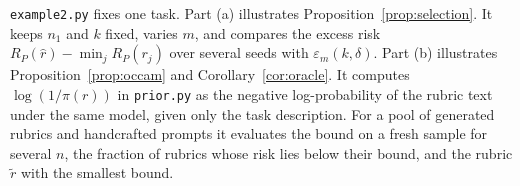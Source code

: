 \documentclass[11pt]{article}
\theoremstyle{plain}
\theoremstyle{definition}
\begin{document}
\texttt{example2.py} fixes one task.
Part (a) illustrates Proposition~\ref{prop:selection}.
It keeps $n_1$ and $k$ fixed, varies $m$, and compares the excess risk $R_P(\hat r)-\min_jR_P(r_j)$ over several seeds with $\varepsilon_m(k,\delta)$.
Part (b) illustrates Proposition~\ref{prop:occam} and Corollary~\ref{cor:oracle}.
It computes $\log(1/\pi(r))$ in \texttt{prior.py} as the negative log-probability of the rubric text under the same model, given only the task description.
For a pool of generated rubrics and handcrafted prompts it evaluates the bound on a fresh sample for several $n$, the fraction of rubrics whose risk lies below their bound, and the rubric $\tilde r$ with the smallest bound.




\appendix

\end{document}
